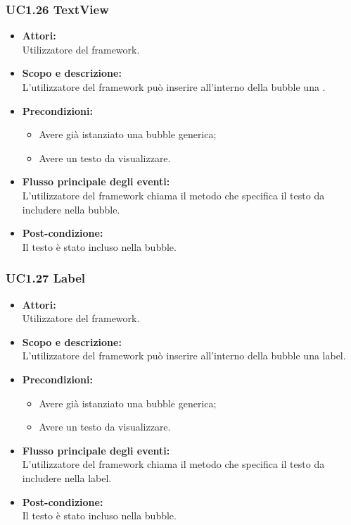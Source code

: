 \subsubsection{UC1.26 TextView} \label{UC1.26}

\begin{itemize}
	\item \textbf{Attori:}
	\\Utilizzatore del framework.
	\item \textbf{Scopo e descrizione:} 
	\\L’utilizzatore del framework può inserire all'interno della bubble una .
	\item \textbf{Precondizioni:}
	\begin{itemize}
		\item Avere già istanziato una bubble generica;
		\item Avere un testo da visualizzare.
	\end{itemize}
	\item \textbf{Flusso principale degli eventi:}
	\\L’utilizzatore del framework chiama il metodo che specifica il testo da includere nella bubble.
	\item \textbf{Post-condizione:}
	\\Il testo è stato incluso nella bubble.
\end{itemize}

\subsubsection{UC1.27 Label} \label{UC1.27}

\begin{itemize}
	\item \textbf{Attori:}
	\\Utilizzatore del framework.
	\item \textbf{Scopo e descrizione:} 
	\\L’utilizzatore del framework può inserire all'interno della bubble una label.
	\item \textbf{Precondizioni:}
	\begin{itemize}
		\item Avere già istanziato una bubble generica;
		\item Avere un testo da visualizzare.
	\end{itemize}
	\item \textbf{Flusso principale degli eventi:}
	\\L’utilizzatore del framework chiama il metodo che specifica il testo da includere nella label.
	\item \textbf{Post-condizione:}
	\\Il testo è stato incluso nella bubble.
\end{itemize}

